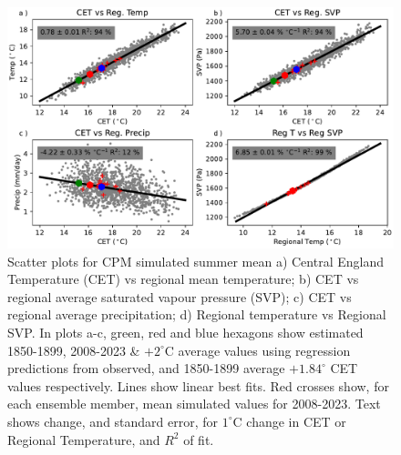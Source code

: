 \documentclass[11pt,a4paper]{article}
\begin{document}
\begin{figure}
	\centering
	\includegraphics[width=\linewidth]{scatter}
	\caption{Scatter plots for CPM simulated summer mean  a)  Central England Temperature (CET) vs  regional mean temperature; b) CET vs regional average saturated vapour pressure (SVP); c) CET vs regional average precipitation; d) Regional temperature vs Regional SVP. In plots a-c, green, red and blue hexagons show  estimated 1850-1899, 2008-2023 \& $+2^\circ$C average values  using regression predictions from observed, and 1850-1899 average $+1.84^\circ$ CET values respectively. Lines show linear best fits. Red crosses show, for each ensemble member, mean simulated values for 2008-2023. Text shows  change, and standard error, for  $1^{\circ}$C change in CET or Regional Temperature, and $R^2$ of fit.}
	\label{fig:cet_scatter}
\end{figure}
\end{document}
